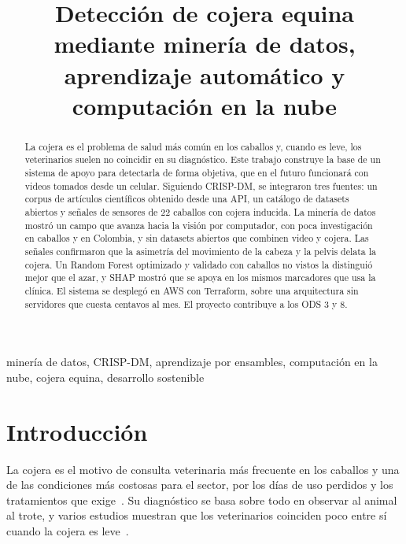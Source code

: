 \documentclass[conference,a4paper]{IEEEtran}
\begin{document}
\title{Detección de cojera equina mediante minería de datos, aprendizaje automático y computación en la nube}

\author{
}

\maketitle

\begin{abstract}
La cojera es el problema de salud más común en los caballos y, cuando es leve, los veterinarios suelen no coincidir en su diagnóstico. Este trabajo construye la base de un sistema de apoyo para detectarla de forma objetiva, que en el futuro funcionará con videos tomados desde un celular. Siguiendo CRISP-DM, se integraron tres fuentes: un corpus de artículos científicos obtenido desde una API, un catálogo de datasets abiertos y señales de sensores de 22 caballos con cojera inducida. La minería de datos mostró un campo que avanza hacia la visión por computador, con poca investigación en caballos y en Colombia, y sin datasets abiertos que combinen video y cojera. Las señales confirmaron que la asimetría del movimiento de la cabeza y la pelvis delata la cojera. Un Random Forest optimizado y validado con caballos no vistos la distinguió mejor que el azar, y SHAP mostró que se apoya en los mismos marcadores que usa la clínica. El sistema se desplegó en AWS con Terraform, sobre una arquitectura sin servidores que cuesta centavos al mes. El proyecto contribuye a los ODS 3 y 8.
\end{abstract}

\begin{IEEEkeywords}
minería de datos, CRISP-DM, aprendizaje por ensambles, computación en la nube, cojera equina, desarrollo sostenible
\end{IEEEkeywords}

\section{Introducción}
La cojera es el motivo de consulta veterinaria más frecuente en los caballos y una de las condiciones más costosas para el sector, por los días de uso perdidos y los tratamientos que exige~\cite{nehs2013,usda1998}. Su diagnóstico se basa sobre todo en observar al animal al trote, y varios estudios muestran que los veterinarios coinciden poco entre sí cuando la cojera es leve~\cite{keegan2010,hammarberg2016}.
\end{document}

